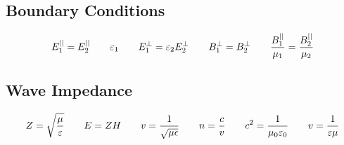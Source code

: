 \documentclass{article}
\begin{document}
\subsection*{Boundary Conditions}
\[E_1^{||}=E_2^{||}\hspace{7 mm}\varepsilon_1\hspace{7 mm}E_1^\perp=\varepsilon_2E_2^\perp\hspace{7 mm}B_1^\perp=B_2^\perp\hspace{7 mm}\frac{B_1^{||}}{\mu_1}=\frac{B_2^{||}}{\mu_2}\]
\subsection*{Wave Impedance}
\[Z=\sqrt{\frac{\mu}{\varepsilon}}\hspace{7 mm}E=ZH\hspace{7 mm}v=\frac{1}{\sqrt{\mu\epsilon}}\hspace{7 mm}n=\frac{c}{v}\hspace{7 mm}c^2=\frac{1}{\mu_0\varepsilon_0}\hspace{7 mm}v=\frac{1}{\varepsilon\mu}\]
\end{document}
